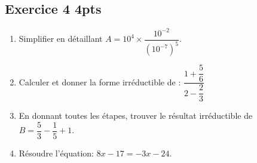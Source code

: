 \documentclass[12pt,a4paper]{article}
\begin{document}
\subsection*{Exercice 4 \hfill 4pts}

\begin{enumerate}
 
\item Simplifier en détaillant $A=10^4\times \dfrac{10^{-2}}{\left(10^{-7}\right)^5}$.
\item Calculer et donner la forme irréductible de : $\dfrac{1+\dfrac{5}{6}}{2-\dfrac{2}{3}}$
\item En donnant toutes les étapes, trouver le résultat irréductible de $B=\dfrac{5}{3}-\dfrac{1}{5}+1 $.
\item Résoudre l'équation: $8x-17=-3x-24 $.





\end{enumerate}
\end{document}
